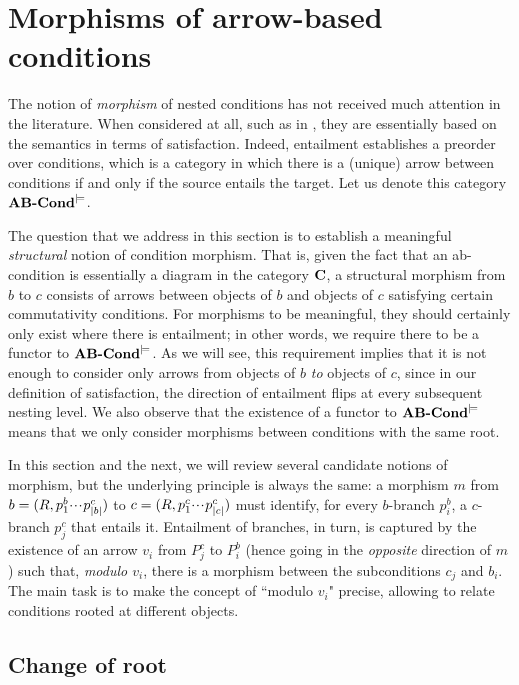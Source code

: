 \section{Morphisms of arrow-based conditions}

The notion of \emph{morphism} of nested conditions has not received much attention in the literature. When considered at all, such as in \cite{Koenig-morphism}, they are essentially based on the semantics in terms of satisfaction. Indeed, entailment establishes a preorder over conditions, which is a category in which there is a (unique) arrow between conditions if and only if the source entails the target.  Let us denote this category $\textbf{AB-Cond}^{\models}$.

The question that we address in this section is to establish a meaningful \emph{structural} notion of condition morphism. That is, given the fact that an ab-condition is essentially a diagram in the category $\mathbf{C}$, a structural morphism from $b$ to $c$ consists of arrows between objects of $b$ and objects of $c$ satisfying certain commutativity conditions. For morphisms to be meaningful, they should certainly only exist where there is entailment; in other words, we require there to be a functor to $\textbf{AB-Cond}^{\models}$. As we will see, this requirement implies that it is not enough to consider only arrows from objects of $b$ \emph{to} objects of $c$, since in our definition of satisfaction, the direction of entailment flips at every subsequent nesting level. We also observe that the existence of a functor to $\textbf{AB-Cond}^{\models}$ means that we only consider morphisms between conditions with the same root.

In this section and the next, we will review several candidate notions of morphism, but the underlying principle is always the same: a morphism $m$ from $b=(R,p^b_1{\cdotp\mkern-2mu\cdotp\mkern-2mu\cdotp\mkern1mu} p^c_{|b|})$ to $c=(R,p^c_1{\cdotp\mkern-2mu\cdotp\mkern-2mu\cdotp\mkern1mu} p^c_{|c|})$ must identify, for every $b$-branch $p^b_i$, a $c$-branch $p^c_j$ that entails it. Entailment of branches, in turn, is captured by the existence of an arrow $v_i$ from $P^c_j$ to $P^b_i$ (hence going in the \emph{opposite} direction of $m$) such that, \emph{modulo $v_i$}, there is a morphism between the subconditions $c_j$ and $b_i$. The main task is to make the concept of ``modulo $v_i$" precise, allowing to relate conditions rooted at different objects.

\subsection{Change of root}

